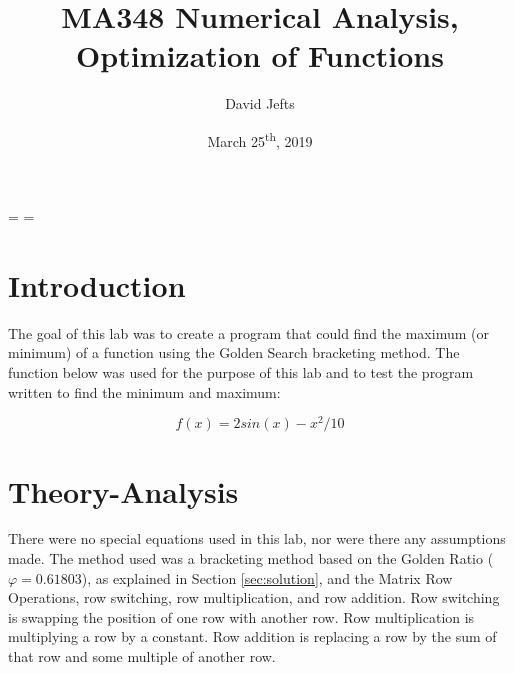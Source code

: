 \documentclass[12pt, letterpaper]{article}
\begin{document}
\setcounter{secnumdepth}{-1}
\binoppenalty=\maxdimen
\relpenalty=\maxdimen

\title{MA348 Numerical Analysis, Optimization of Functions}
\author{David Jefts}
\date{March 25\textsuperscript{th}, 2019}
\begin{titlepage}
	\centering
	\maketitle
	\centering
	\hfill
	\vfill
	\thispagestyle{empty}
\end{titlepage}

\setlength{\voffset}{-0.5in}
\setlength{\headsep}{10pt}

\section{\label{sec:intro}Introduction}
	The goal of this lab was to create a program that could find the maximum (or minimum) of a function using the Golden Search bracketing method. The function below was used for the purpose of this lab and to test the program written to find the minimum and maximum: 
	
	\begin{equation*}{f(x)=2 sin(x)-x^2/10}\end{equation*}

\section{\label{sesc:theory}Theory-Analysis}
	 There were no special equations used in this lab, nor were there any assumptions made. The method used was a bracketing method based on the Golden Ratio ($\varphi=0.61803$), as explained in Section \ref{sec:solution}, and the Matrix Row Operations, row switching, row multiplication, and row addition. Row switching is swapping the position of one row with another row. Row multiplication is multiplying a row by a constant. Row addition is replacing a row by the sum of that row and some multiple of another row.
\end{document}
